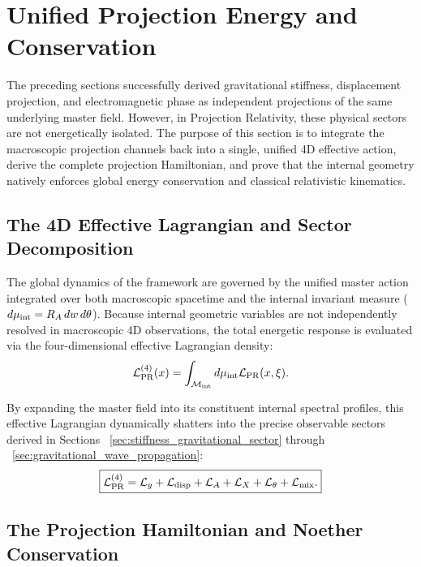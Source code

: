 \documentclass[11pt]{article}
\begin{document}
\section{Unified Projection Energy and Conservation}
\label{sec:unified_projection_energy}

The preceding sections successfully derived gravitational stiffness, displacement projection, and electromagnetic phase as independent projections of the same underlying master field. However, in Projection Relativity, these physical sectors are not energetically isolated. The purpose of this section is to integrate the macroscopic projection channels back into a single, unified 4D effective action, derive the complete projection Hamiltonian, and prove that the internal geometry natively enforces global energy conservation and classical relativistic kinematics.

\subsection{The 4D Effective Lagrangian and Sector Decomposition}
\label{sec:effective_lagrangian_decomposition}

The global dynamics of the framework are governed by the unified master action integrated over both macroscopic spacetime and the internal invariant measure ($d\mu_{\rm int} = R_A \, dw \, d\theta$). Because internal geometric variables are not independently resolved in macroscopic 4D observations, the total energetic response is evaluated via the four-dimensional effective Lagrangian density:
\begin{equation}
\mathcal{L}_{\rm PR}^{(4)}(x) = \int_{\mathcal{M}_{\rm int}} d\mu_{\rm int} \mathcal{L}_{\rm PR}(x, \xi).
\end{equation}

By expanding the master field into its constituent internal spectral profiles, this effective Lagrangian dynamically shatters into the precise observable sectors derived in Sections ~\ref{sec:stiffness_gravitational_sector} through ~\ref{sec:gravitational_wave_propagation}:
\begin{equation}
\boxed{
\mathcal L_{\rm PR}^{(4)}
=
\mathcal L_g
+
\mathcal L_{\rm disp}
+
\mathcal L_A
+
\mathcal L_X
+
\mathcal L_\theta
+
\mathcal L_{\rm mix}.
}
\end{equation}

\subsection{The Projection Hamiltonian and Noether Conservation}
\label{sec:projection_hamiltonian}
\end{document}
